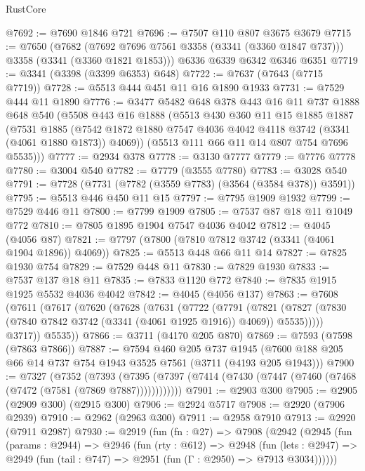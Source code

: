 \begin{lexlean}{RustCore}
\begin{coremodule}
@7692 := @7690 @1846 @721
@7696 := @7507 @110 @807 @3675 @3679
@7715 := @7650
    (@7682 (@7692 @7696 @7561 @3358 (@3341 (@3360 @1847 @737))) @3358 (@3341 (@3360 @1821 @1853)))
    @6336
    @6339
    @6342
    @6346
    @6351
@7719 := @3341 (@3398 (@3399 @6353) @648)
@7722 := @7637 (@7643 (@7715 @7719))
@7728 := @5513 @444 @451 @11 @16 @1890 @1933
@7731 := @7529 @444 @11 @1890
@7776 := @3477
    @5482
    @648
    @378
    @443
    @16
    @11
    @737
    @1888
    @648
    @540
    (@5508
      @443
      @16
      @1888
      (@5513
        @430
        @360
        @11
        @15
        @1885
        @1887
        (@7531
          @1885
          (@7542 @1872 @1880 @7547 @4036 @4042 @4118 @3742 (@3341 (@4061 @1880 @1873)) @4069))
        (@5513 @111 @66 @11 @14 @807 @754 @7696 @5535)))
@7777 := @2934 @378
@7778 := @3130 @7777
@7779 := @7776 @7778
@7780 := @3004 @540
@7782 := @7779 (@3555 @7780)
@7783 := @3028 @540
@7791 := @7728 (@7731 (@7782 (@3559 @7783) (@3564 (@3584 @378)) @3591))
@7795 := @5513 @446 @450 @11 @15
@7797 := @7795 @1909 @1932
@7799 := @7529 @446 @11
@7800 := @7799 @1909
@7805 := @7537 @87 @18 @11 @1049 @772
@7810 := @7805 @1895 @1904 @7547 @4036 @4042
@7812 := @4045 (@4056 @87)
@7821 := @7797 (@7800 (@7810 @7812 @3742 (@3341 (@4061 @1904 @1896)) @4069))
@7825 := @5513 @448 @66 @11 @14
@7827 := @7825 @1930 @754
@7829 := @7529 @448 @11
@7830 := @7829 @1930
@7833 := @7537 @137 @18 @11
@7835 := @7833 @1120 @772
@7840 := @7835 @1915 @1925 @5532 @4036 @4042
@7842 := @4045 (@4056 @137)
@7863 := @7608
    (@7611
      (@7617
        (@7620
          (@7628
            (@7631
              (@7722
                (@7791
                  (@7821
                    (@7827 (@7830 (@7840 @7842 @3742 (@3341 (@4061 @1925 @1916)) @4069)) @5535)))))
            @3717))
        @5535))
@7866 := @3711 (@4170 @205 @870)
@7869 := @7593 (@7598 (@7863 @7866))
@7887 := @7594
    @460
    @205
    @737
    @1945
    (@7600 @188 @205 @66 @14 @737 @754 @1943 @3525 @7561 (@3711 (@4193 @205 @1943)))
@7900 := @7327
    (@7352
      (@7393 (@7395 (@7397 (@7414 (@7430 (@7447 (@7460 (@7468 (@7472 (@7581 (@7869 @7887))))))))))))
@7901 := @2903 @300
@7905 := @2905 (@2909 @300) (@2915 @300)
@7906 := @2924 @5717
@7908 := @2920 (@7906 @2939)
@7910 := @2962 (@2963 @300)
@7911 := @2958 @7910
@7913 := @2920 (@7911 @2987)
@7930 := @2919
    (fun (fn : @27) =>
    @7908
      (@2942
        (@2945
          (fun (params : @2944) =>
          @2946
            (fun (rty : @612) =>
            @2948
              (fun (lets : @2947) =>
              @2949 (fun (tail : @747) => @2951 (fun (Γ : @2950) => @7913 @3034))))))

\end{coremodule}
\end{lexlean}
